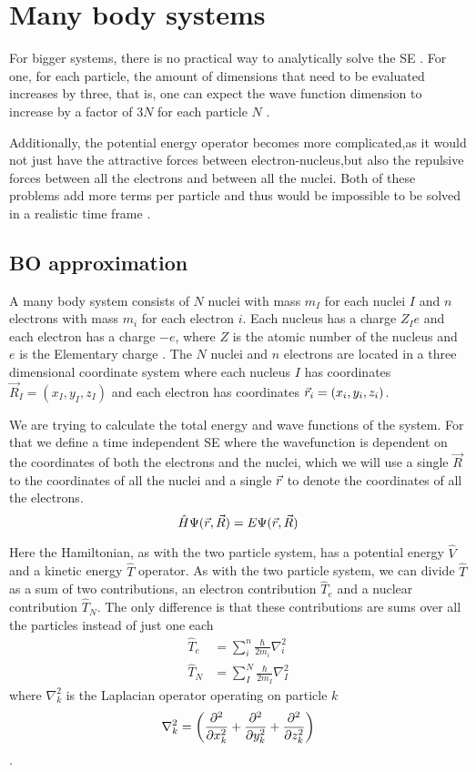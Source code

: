 \documentclass[../master_thesis.tex]{subfiles}
\begin{document}
\section{Many body systems}

For bigger systems, there is no practical way to analytically solve the
\ac{SE} \cite{Jensen:2017}. For one, for each particle, the amount of dimensions that need to be
evaluated increases by three, that is, one can expect the wave function
dimension to increase by a factor of $3N$ for each particle $N$
\cite{Cramer:2004}.

Additionally, the potential energy operator becomes more complicated,as it
would not just have the attractive forces between electron-nucleus,but also the
repulsive forces between all the electrons and between all the nuclei. Both of
these problems add more terms per particle and thus would be impossible to be
solved in a realistic time frame \cite{Jensen:2017}.

\subsection{\ac{BO} approximation}
A many body system consists of $N$ nuclei with mass $m_I$ for each nuclei $I$
and $n$ electrons with mass $m_i$ for each electron $i$. Each nucleus has a
charge $Z_Ie$ and each electron has a charge $-e$, where $Z$ is the atomic
number of the nucleus  and $e$ is the Elementary charge \cite{Atkins:2014}. The $N$ nuclei and $n$
electrons are located in a three dimensional coordinate system where each nucleus $I$ has
coordinates $\vec{R}_I = (x_I, y_I, z_I)$ and each electron has coordinates
$\vec{r}_i = (x_i, y_i, z_i)$.

We are trying to calculate the total energy and wave functions of the system. For
that we define a time independent \ac{SE} where the wavefunction is dependent on
the coordinates of both the electrons and the nuclei, which we will use a single $\vec{R}$
to the coordinates of all the nuclei and a single $\vec{r}$ to denote the coordinates
of all the electrons.
\begin{equation}\label{eq:totalheliumSE}
  \hat{H}\Psi(\vec{r}, \vec{R}) = E \Psi(\vec{r}, \vec{R})
\end{equation}

Here the Hamiltonian, as with the two particle system, has a potential energy $\hat{V}$ and a
kinetic energy $\hat{T}$ operator. As with the two particle system, we can divide $\hat{T}$ as
a sum of two contributions, an electron contribution $\hat{T}_e$ and a nuclear contribution
$\hat{T}_N$. The only difference is that these contributions are sums over all
the particles  instead of just one each\cite{Cramer:2004}
\begin{align}
  \hat{T}_e &= \sum_i^n \frac{\hbar}{2m_i}\nabla^2_i\\
  \hat{T}_N &= \sum_I^N \frac{\hbar}{2m_I}\nabla^2_I
\end{align}
where $\nabla^2_k$ is the Laplacian operator operating on particle $k$
\begin{equation}
  \nabla^2_k = \left( \frac{\partial^2}{\partial x_k^2} + \frac{\partial^2}{\partial y_k^2} + \frac{\partial^2}{\partial z_k^2} \right)
\end{equation}.
\end{document}
